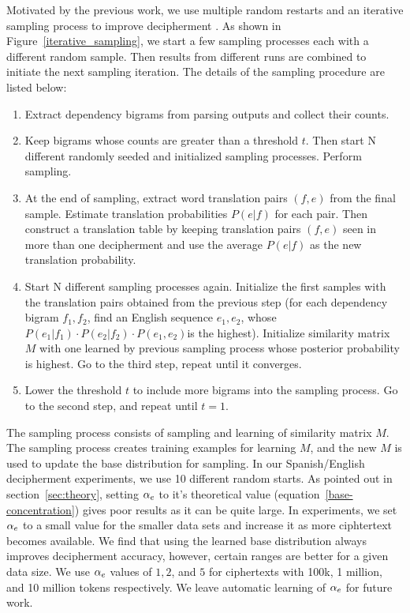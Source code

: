 Motivated by the previous work, we use multiple random restarts and an iterative sampling process to improve decipherment \cite{Dou:2012}. As shown in Figure~\ref{iterative_sampling}, we start a few sampling processes each with a different random sample. Then results from different runs are combined to initiate the next sampling iteration. The details of the sampling procedure are listed below:

 \begin{enumerate}
  \item Extract dependency bigrams from parsing outputs and collect their counts.
  \item Keep bigrams whose counts are greater than a threshold $t$. Then start N different randomly seeded and initialized sampling processes. Perform sampling.
  \item At the end of sampling, extract word translation pairs $(f,e)$ from the final sample. Estimate translation probabilities $P(e|f)$ for each pair. Then construct a translation table by keeping translation pairs $(f,e)$ seen in more than one decipherment and use the average $P(e|f)$ as the new translation probability.
  \item Start N different sampling processes again. Initialize the first samples with the translation pairs obtained from the previous step (for each dependency bigram $f_{1},f_{2}$, find an English sequence $e_{1},e_{2}$, whose $P(e_{1}|f_{1})\cdot P(e_{2}|f_{2})\cdot P(e_{1},e_{2})$is the highest). Initialize similarity matrix $M$ with one learned by previous sampling process whose posterior probability is highest. Go to the third step, repeat until it converges.
  \item Lower the threshold $t$ to include more bigrams into the sampling process. Go to the second step, and repeat until $t=1$.
 \end{enumerate}

The sampling process consists of sampling and learning of similarity matrix $M$. The sampling process creates training examples for learning $M$, and the new $M$ is used to update the base distribution for sampling. In our Spanish/English decipherment experiments, we use 10 different random starts. As pointed out in section~\ref{sec:theory}, setting $\alpha_{e}$ to it's theoretical value (equation~\ref{base-concentration}) gives poor results as it can be quite large. In experiments, we set $\alpha_{e}$ to a small value for the smaller data sets and increase it as more ciphtertext becomes available. We find that using the learned base distribution always improves decipherment accuracy, however, certain ranges are better for a given data size. We use $\alpha_{e}$ values of $1, 2$, and $5$ for ciphertexts with 100k, 1 million, and 10 million tokens respectively. We leave automatic learning of $\alpha_{e}$ for future work.

